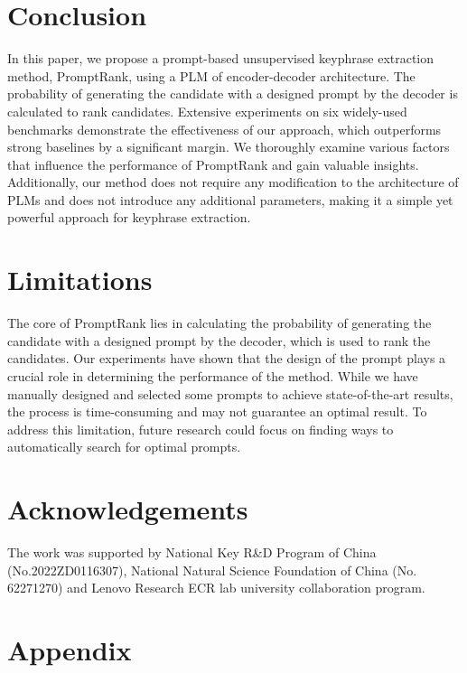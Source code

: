 \documentclass[11pt]{article}
\begin{document}
\section{Conclusion}
In this paper, we propose a prompt-based unsupervised keyphrase extraction method, PromptRank, using a PLM of encoder-decoder architecture. The probability of generating the candidate with a designed prompt by the decoder is calculated to rank candidates. Extensive experiments on six widely-used benchmarks demonstrate the effectiveness of our approach, which outperforms strong baselines by a significant margin. We thoroughly examine various factors that influence the performance of PromptRank and gain valuable insights. Additionally, our method does not require any modification to the architecture of PLMs and does not introduce any additional parameters, making it a simple yet powerful approach for keyphrase extraction.

\newpage

\section*{Limitations}

The core of PromptRank lies in calculating the probability of generating the candidate with a designed prompt by the decoder, which is used to rank the candidates. Our experiments have shown that the design of the prompt plays a crucial role in determining the performance of the method. While we have manually designed and selected some prompts to achieve state-of-the-art results, the process is time-consuming and may not guarantee an optimal result. To address this limitation, future research could focus on finding ways to automatically search for optimal prompts.



\section*{Acknowledgements}
The work was supported by National Key R\&D Program of China (No.2022ZD0116307), National Natural Science Foundation of China (No. 62271270) and Lenovo Research ECR lab university collaboration program.




\clearpage
\appendix

\section{Appendix}
\label{sec:appendix}
\end{document}
